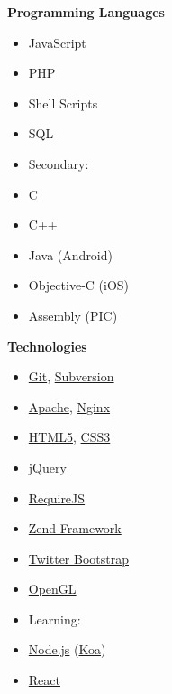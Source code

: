 \noindent
\begin{minipage}[t]{.3\linewidth}
\vspace{0pt}
\textbf{Programming Languages}
\begin{itemize}[itemsep=0pt]    %
    \item JavaScript
    \item PHP
    \item Shell Scripts
    \item SQL
    \item[] \hspace*{-2em} Secondary:
    \item C
    \item C++
    \item Java (Android)
    \item Objective-C (iOS)
    \item Assembly (PIC)
\end{itemize}
\end{minipage}
%
\hfill
%
\begin{minipage}[t]{.25\linewidth}
\vspace{0pt}
\textbf{Technologies}
\begin{itemize}[itemsep=0pt]
    \item \href{http://git-scm.com}{Git},
          \href{http://subversion.apache.org}{Subversion}
    \item \href{http://httpd.apache.org}{Apache},
          \href{http://nginx.com}{Nginx}
    \item \href{http://www.w3.org/html/wg/drafts/html/master/Overview.html}{HTML5},
          \href{http://www.w3.org/Style/CSS}{CSS3}
    \item \href{http://jquery.com}{jQuery}
    \item \href{http://requirejs.org}{RequireJS}
    \item \href{http://framework.zend.com}{Zend Framework}
    \item \href{http://getbootstrap.com}{Twitter Bootstrap}
    \item \href{http://opengl.org}{OpenGL}
    \item[] \hspace*{-2em} Learning:
    \item \href{http://nodejs.org}{Node.js} (\href{http://koajs.com}{Koa})
    \item \href{http://facebook.github.io/react}{React}
\end{itemize}
\end{minipage}
